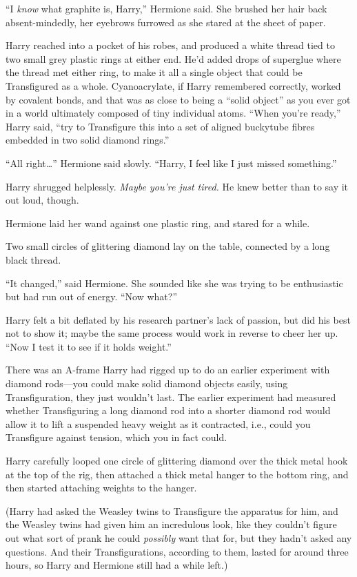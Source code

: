 “I \emph{know} what graphite is, Harry,” Hermione said. She brushed her hair back absent-mindedly, her eyebrows furrowed as she stared at the sheet of paper.

Harry reached into a pocket of his robes, and produced a white thread tied to two small grey plastic rings at either end. He’d added drops of superglue where the thread met either ring, to make it all a single object that could be Transfigured as a whole. Cyanoacrylate, if Harry remembered correctly, worked by covalent bonds, and that was as close to being a “solid object” as you ever got in a world ultimately composed of tiny individual atoms. “When you’re ready,” Harry said, “try to Transfigure this into a set of aligned buckytube fibres embedded in two solid diamond rings.”

“All right…” Hermione said slowly. “Harry, I feel like I just missed something.”

Harry shrugged helplessly. \emph{Maybe you’re just tired.} He knew better than to say it out loud, though.

Hermione laid her wand against one plastic ring, and stared for a while.

Two small circles of glittering diamond lay on the table, connected by a long black thread.

“It changed,” said Hermione. She sounded like she was trying to be enthusiastic but had run out of energy. “Now what?”

Harry felt a bit deflated by his research partner’s lack of passion, but did his best not to show it; maybe the same process would work in reverse to cheer her up. “Now I test it to see if it holds weight.”

There was an A-frame Harry had rigged up to do an earlier experiment with diamond rods—you could make solid diamond objects easily, using Transfiguration, they just wouldn’t last. The earlier experiment had measured whether Transfiguring a long diamond rod into a shorter diamond rod would allow it to lift a suspended heavy weight as it contracted, i.e., could you Transfigure against tension, which you in fact could.

Harry carefully looped one circle of glittering diamond over the thick metal hook at the top of the rig, then attached a thick metal hanger to the bottom ring, and then started attaching weights to the hanger.

(Harry had asked the Weasley twins to Transfigure the apparatus for him, and the Weasley twins had given him an incredulous look, like they couldn’t figure out what sort of prank he could \emph{possibly} want that for, but they hadn’t asked any questions. And their Transfigurations, according to them, lasted for around three hours, so Harry and Hermione still had a while left.)

